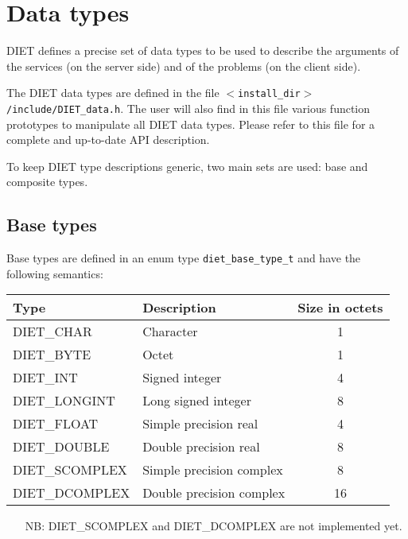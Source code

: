 \section{Data types}
\label{sec:types}

DIET defines a precise set of data types to be used to describe the arguments of
the services (on the server side) and of the problems (on the client side).

The DIET data types are defined in the file
\texttt{$<$install\_dir$>$/include/DIET\_data.h}. The user will also find in
this file various function prototypes to manipulate all DIET data types. Please
refer to this file for a complete and up-to-date API description.

To keep DIET type descriptions generic, two main sets are used: base and
composite types.

\subsection{Base types}
\label{ssec:base}

Base types are defined in an enum type \texttt{diet\_base\_type\_t} and have the
following semantics:
\begin{center}
\footnotesize
\begin{tabular}{|l|l|c|}
\hline
\textbf{Type}&\textbf{Description}&\textbf{Size in octets}\\
\hline
\textsf{DIET\_CHAR}     & Character                &  1\\
\textsf{DIET\_BYTE}     & Octet                    &  1\\
\textsf{DIET\_INT}      & Signed integer           &  4\\
\textsf{DIET\_LONGINT}  & Long signed integer      &  8\\
\textsf{DIET\_FLOAT}    & Simple precision real    &  4\\
\textsf{DIET\_DOUBLE}   & Double precision real    &  8\\
\hline\hline
\textsf{DIET\_SCOMPLEX} & Simple precision complex &  8\\
\textsf{DIET\_DCOMPLEX} & Double precision complex & 16\\
\hline
\end{tabular}
\end{center}

\begin{itemize}
\item[NB:] \textsf{DIET\_SCOMPLEX} and \textsf{DIET\_DCOMPLEX} are not implemented yet.
\end{itemize}


